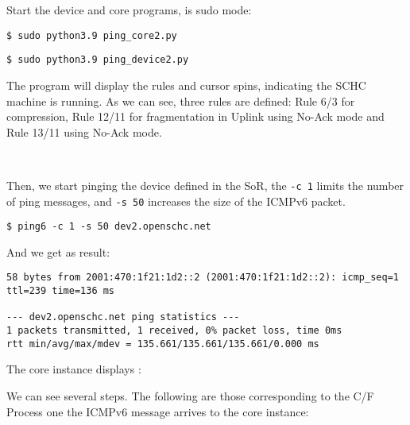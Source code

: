 \documentclass[onecolumn,12pt]{book}
\newcounter{c}
\begin{document}
Start the device and core programs, is sudo mode:

\begin{lstlisting}
$ sudo python3.9 ping_core2.py 
\end{lstlisting}

\begin{lstlisting}
$ sudo python3.9 ping_device2.py 
\end{lstlisting}

The program will display the rules and cursor spins, indicating the SCHC machine is running.
As we can see, three rules are defined: Rule 6/3 for compression, Rule 12/11 for fragmentation in Uplink using No-Ack mode and Rule 13/11 using No-Ack mode.

~



Then, we start pinging the device defined in the SoR, the \texttt{-c 1} limits the number of ping messages, and \texttt{-s 50} increases the size of the ICMPv6 packet.

\begin{lstlisting}
$ ping6 -c 1 -s 50 dev2.openschc.net
\end{lstlisting}

And we get as result:

\begin{lstlisting}[basicstyle=\ttfamily\scriptsize]
58 bytes from 2001:470:1f21:1d2::2 (2001:470:1f21:1d2::2): icmp_seq=1 ttl=239 time=136 ms

--- dev2.openschc.net ping statistics ---
1 packets transmitted, 1 received, 0% packet loss, time 0ms
rtt min/avg/max/mdev = 135.661/135.661/135.661/0.000 ms

\end{lstlisting}

The core instance displays :



We can see several steps. 
The following are those corresponding to the C/F Process one the ICMPv6 message arrives to the core instance:

~
\end{document}
